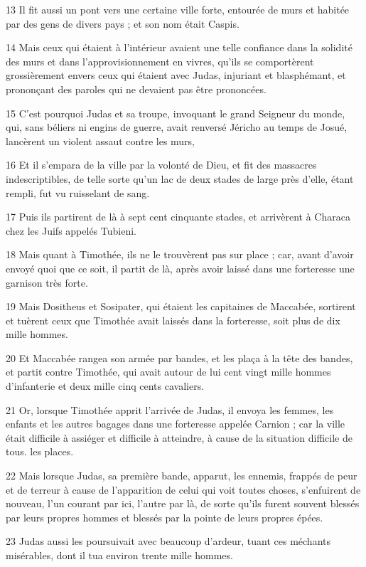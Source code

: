 \par 13 Il fit aussi un pont vers une certaine ville forte, entourée de murs et habitée par des gens de divers pays ; et son nom était Caspis.
\par 14 Mais ceux qui étaient à l'intérieur avaient une telle confiance dans la solidité des murs et dans l'approvisionnement en vivres, qu'ils se comportèrent grossièrement envers ceux qui étaient avec Judas, injuriant et blasphémant, et prononçant des paroles qui ne devaient pas être prononcées.
\par 15 C'est pourquoi Judas et sa troupe, invoquant le grand Seigneur du monde, qui, sans béliers ni engins de guerre, avait renversé Jéricho au temps de Josué, lancèrent un violent assaut contre les murs,
\par 16 Et il s'empara de la ville par la volonté de Dieu, et fit des massacres indescriptibles, de telle sorte qu'un lac de deux stades de large près d'elle, étant rempli, fut vu ruisselant de sang.
\par 17 Puis ils partirent de là à sept cent cinquante stades, et arrivèrent à Characa chez les Juifs appelés Tubieni.
\par 18 Mais quant à Timothée, ils ne le trouvèrent pas sur place ; car, avant d'avoir envoyé quoi que ce soit, il partit de là, après avoir laissé dans une forteresse une garnison très forte.
\par 19 Mais Dositheus et Sosipater, qui étaient les capitaines de Maccabée, sortirent et tuèrent ceux que Timothée avait laissés dans la forteresse, soit plus de dix mille hommes.
\par 20 Et Maccabée rangea son armée par bandes, et les plaça à la tête des bandes, et partit contre Timothée, qui avait autour de lui cent vingt mille hommes d'infanterie et deux mille cinq cents cavaliers.
\par 21 Or, lorsque Timothée apprit l'arrivée de Judas, il envoya les femmes, les enfants et les autres bagages dans une forteresse appelée Carnion ; car la ville était difficile à assiéger et difficile à atteindre, à cause de la situation difficile de tous. les places.
\par 22 Mais lorsque Judas, sa première bande, apparut, les ennemis, frappés de peur et de terreur à cause de l'apparition de celui qui voit toutes choses, s'enfuirent de nouveau, l'un courant par ici, l'autre par là, de sorte qu'ils furent souvent blessés par leurs propres hommes et blessés par la pointe de leurs propres épées.
\par 23 Judas aussi les poursuivait avec beaucoup d'ardeur, tuant ces méchants misérables, dont il tua environ trente mille hommes.
